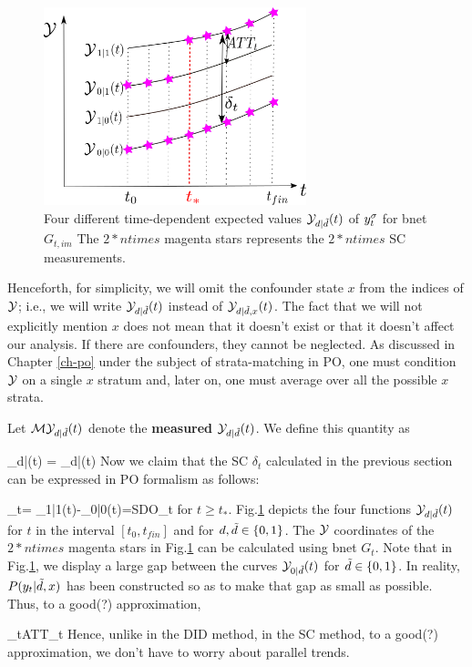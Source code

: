 \begin{figure}[h!]
\centering
\includegraphics[width=3in]
{syn-con/syn-con-bc.png}
\caption{Four different time-dependent
expected 
values ${\cal Y}_{d|{\tilde{d}}}(t)$ of $y^\sigma_t$
for bnet $G_{t, im}$
The $2*ntimes$ magenta  stars
represents the $2*ntimes$ SC measurements.} 
\label{fig-syn-con-bc}
\end{figure}

Henceforth, 
for simplicity, we will
omit the confounder state $x$
from the indices of ${\cal Y}$; i.e., we will write
${\cal Y}_{d|{\tilde{d}}}(t)$
instead of ${\cal Y}_{d|{\tilde{d}}, x}(t)$.
The fact that we will
not explicitly
mention $x$ does not
mean that it doesn't exist
or that it doesn't affect our analysis.
If there are confounders,
they cannot be neglected.
As discussed in Chapter \ref{ch-po}
under the subject of strata-matching in PO,
one must condition ${\cal Y}$
on a single $x$ stratum
and, later on,  one must average
over all the possible $x$ strata.


Let ${\cal M}{\cal Y}_{d|{\tilde{d}}}(t)$ denote the
{\bf measured ${\cal Y}_{d|{\tilde{d}}}(t)$}.
We define this quantity as

\beq
\calm\caly_{d|\td}(t)
=
\caly_{d|\td}(t)
\left[ \indi(d=0, t< t_*)+
\indi(d=\td, t\geq t_*)\right]
\eeq
Now we claim that the SC 
$\delta_t$ calculated in the 
previous section 
can be expressed in PO formalism as follows:

\beqa
\delta_t=
\caly_{1|1}(t)-\caly_{0|0}(t)=SDO_t
\;
\eeqa
for $t\geq t_*$.
Fig.\ref{fig-syn-con-bc}
depicts the
four functions
${\cal Y}_{d|{\tilde{d}}}(t)$
for $t$ in the interval  $[t_0, t_{fin}]$
and for $d,{\tilde{d}}\in \{0,1\}$.
The ${\cal Y}$ coordinates
of the $2*ntimes$ magenta stars in 
Fig.\ref{fig-syn-con-bc} can 
be calculated using bnet $G_t$.
Note that in Fig.\ref{fig-syn-con-bc},
we display a large gap
between the curves ${\cal Y}_{0|{\tilde{d}}}(t)$
for ${\tilde{d}}\in \{0,1\}$.
In reality, $P(y_t|{\tilde{d}},x)$ has been
constructed so as to make that
gap as small as possible.
Thus, to a good(?) approximation,

\beq
\delta_t\approx ATT_t
\eeq
Hence, unlike in the DID method,
in the SC method, to a good(?)
approximation, we don't have to worry
about parallel trends.